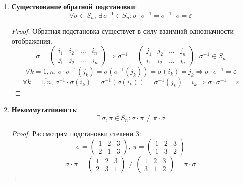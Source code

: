 \documentclass[12pt]{article}
\newcommand{\VE}{\varepsilon}
\theoremstyle{definition}
\begin{document}
\begin{enumerate}[label=\arabic*)]
	\item \textbf{Существование обратной подстановки}:
	$$
		\forall \sigma \in S_n, \, \exists \, \sigma^{-1} \in S_n \colon \sigma{\cdot}\sigma^{-1} = \sigma^{-1}{\cdot}\sigma = \VE
	$$
	\begin{proof}
		Обратная подстановка существует в силу взаимной однозначности отображения. 
		$$
			\sigma = 	
			\begin{pmatrix}
				i_1 & i_2 & \dotsc & i_n\\
				j_1 & j_2 & \dotsc & j_n
			\end{pmatrix} \Rightarrow \sigma^{-1} = 
			\begin{pmatrix}
				j_1 & j_2 & \dotsc & j_n\\
				i_1 & i_2 & \dotsc & i_n
			\end{pmatrix}, \, \sigma^{-1} \in S_n
		$$
		$$
			\forall k =\overline{1,n}, \, \sigma{\cdot}\sigma^{-1}(j_k) = \sigma(\sigma^{-1}(j_k)) = \sigma(i_k) = j_k \Rightarrow \sigma{\cdot}\sigma^{-1} = \VE
		$$
		$$
			\forall k =\overline{1,n}, \, \sigma^{-1}{\cdot}\sigma(i_k) = \sigma^{-1}(\sigma(i_k)) = \sigma^{-1}(j_k) = i_k \Rightarrow \sigma{\cdot}\sigma^{-1} = \VE
		$$
	\end{proof}
	\item \textbf{Некоммутативность}:
	$$
		\exists \, \sigma, \pi \in S_n \colon \sigma{\cdot}\pi \neq \pi{\cdot}\sigma
	$$
	\begin{proof}
		Рассмотрим подстановки степени $3$:
		$$
			\sigma = 
			\begin{pmatrix}
				1 & 2 & 3\\
				2  &1 & 3
			\end{pmatrix}, \, 
			\pi = 
			\begin{pmatrix}
				1 & 2 & 3\\
				1 & 3 & 2
			\end{pmatrix}
		$$
		$$
			\sigma{\cdot}\pi = 
			\begin{pmatrix}
				1 & 2 & 3\\
				2 & 3 & 1
			\end{pmatrix} \neq 
			\begin{pmatrix}
				1 & 2 & 3\\
				3 & 1 & 2
			\end{pmatrix} = \pi{\cdot}\sigma
		$$
	\end{proof}
\end{enumerate}
\end{document}
